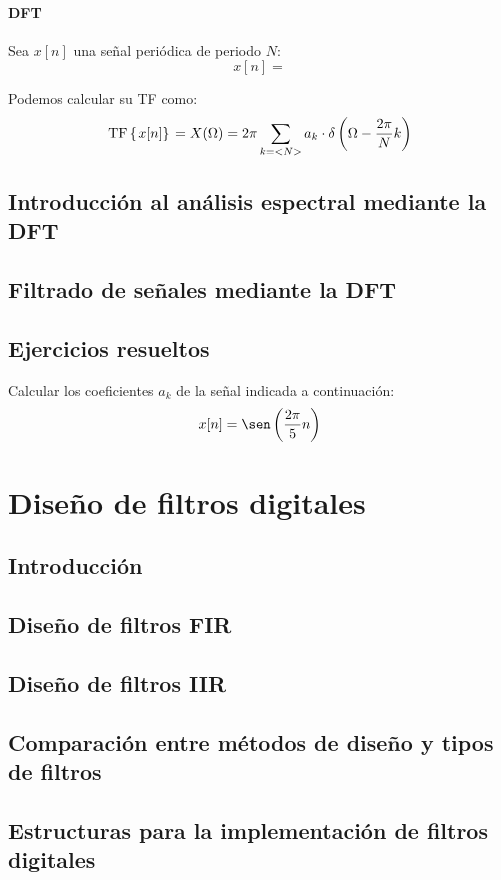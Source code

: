 \documentclass[a4paper]{book}
\begin{document}
\subsubsection{DFT}

Sea $x[n]$ una señal periódica de periodo $N$: \[ x[n] = \]

Podemos calcular su TF como:
\[ \mathrm{TF} \left\lbrace \left. x[n] \right\rbrace \right. = X(\Omega ) = 2\pi \sum_{k=<N>}a_k \cdot \delta \left( \Omega - \frac{2\pi}{N}k \right)\]

\section{Introducción al análisis espectral mediante la DFT}

\section{Filtrado de señales mediante la DFT}

\section{Ejercicios resueltos}


Calcular los coeficientes $a_k$ de la señal indicada a continuación: \[ x[n] = \sen \left( \frac{2\pi}{5}n \right) \]



\chapter{Diseño de filtros digitales} \label{temaDeFiltros}

\section{Introducción}

\section{Diseño de filtros FIR}

\section{Diseño de filtros IIR}

\section{Comparación entre métodos de diseño y tipos de filtros}

\section{Estructuras para la implementación de filtros digitales}

\end{document}

